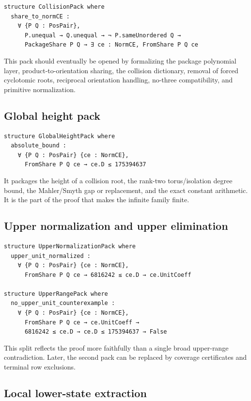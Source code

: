 \documentclass[11pt]{article}
\begin{document}
\begin{lstlisting}[language={}]
structure CollisionPack where
  share_to_normCE :
    ∀ {P Q : PosPair},
      P.unequal → Q.unequal → ¬ P.sameUnordered Q →
      PackageShare P Q → ∃ ce : NormCE, FromShare P Q ce
\end{lstlisting}

This pack should eventually be opened by formalizing the package polynomial
layer, product-to-orientation sharing, the collision dictionary, removal of
forced cyclotomic roots, reciprocal orientation handling, no-three
compatibility, and primitive normalization.

\subsection{Global height pack}

\begin{lstlisting}[language={}]
structure GlobalHeightPack where
  absolute_bound :
    ∀ {P Q : PosPair} {ce : NormCE},
      FromShare P Q ce → ce.D ≤ 175394637
\end{lstlisting}
It packages the height of a collision root, the rank-two torus/isolation degree
bound, the Mahler/Smyth gap or replacement, and the exact constant arithmetic.
It is the part of the proof that makes the infinite family finite.

\subsection{Upper normalization and upper elimination}

\begin{lstlisting}[language={}]
structure UpperNormalizationPack where
  upper_unit_normalized :
    ∀ {P Q : PosPair} {ce : NormCE},
      FromShare P Q ce → 6816242 ≤ ce.D → ce.UnitCoeff

structure UpperRangePack where
  no_upper_unit_counterexample :
    ∀ {P Q : PosPair} {ce : NormCE},
      FromShare P Q ce → ce.UnitCoeff →
      6816242 ≤ ce.D → ce.D ≤ 175394637 → False
\end{lstlisting}
This split reflects the proof more faithfully than a single broad upper-range
contradiction.  Later, the second pack can be replaced by coverage certificates
and terminal row exclusions.

\subsection{Local lower-state extraction}
\end{document}
